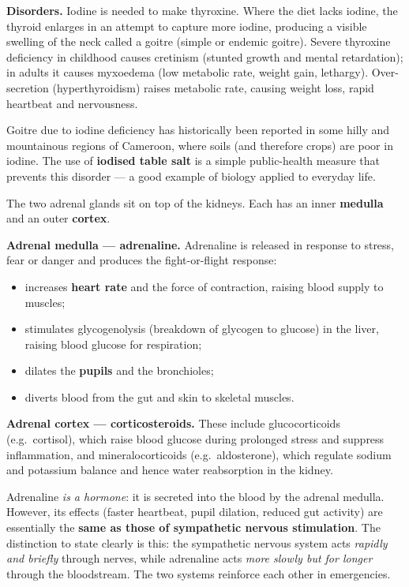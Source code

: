\documentclass[11pt]{article}
\newcommand{\cle}[1]{{\popxbold\color{popdark}#1}}
\newcounter{popsec}
\newcounter{popsub}
\newcommand{\courssub}[1]{%
  \stepcounter{popsub}%
  \par\vspace{9pt}\noindent{\popxbold\fontsize{11.5}{13}\selectfont\color{popink}{\color{poporange}\thepopsec.\thepopsub}\hspace{6pt}#1}\par\nopagebreak\vspace{4pt}
}
\begin{document}
\textbf{Disorders.} Iodine is needed to make thyroxine. Where the diet lacks iodine, the thyroid enlarges in an attempt to capture more iodine, producing a visible swelling of the neck called a \cle{goitre} (simple or endemic goitre). Severe thyroxine deficiency in childhood causes \cle{cretinism} (stunted growth and mental retardation); in adults it causes \cle{myxoedema} (low metabolic rate, weight gain, lethargy). Over-secretion (hyperthyroidism) raises metabolic rate, causing weight loss, rapid heartbeat and nervousness.

\begin{savaistu}
Goitre due to iodine deficiency has historically been reported in some hilly and mountainous regions of Cameroon, where soils (and therefore crops) are poor in iodine. The use of \textbf{iodised table salt} is a simple public-health measure that prevents this disorder --- a good example of biology applied to everyday life.
\end{savaistu}

\courssub{The Adrenal Glands}

The two \cle{adrenal glands} sit on top of the kidneys. Each has an inner \textbf{medulla} and an outer \textbf{cortex}.

\textbf{Adrenal medulla --- adrenaline.} \cle{Adrenaline} is released in response to stress, fear or danger and produces the \cle{fight-or-flight} response:

\begin{itemize}
\item increases \textbf{heart rate} and the force of contraction, raising blood supply to muscles;
\item stimulates \cle{glycogenolysis} (breakdown of glycogen to glucose) in the liver, raising blood glucose for respiration;
\item dilates the \textbf{pupils} and the bronchioles;
\item diverts blood from the gut and skin to skeletal muscles.
\end{itemize}

\textbf{Adrenal cortex --- corticosteroids.} These include glucocorticoids (e.g.\ cortisol), which raise blood glucose during prolonged stress and suppress inflammation, and mineralocorticoids (e.g.\ aldosterone), which regulate sodium and potassium balance and hence water reabsorption in the kidney.

\begin{attention}
Adrenaline \emph{is a hormone}: it is secreted into the blood by the adrenal medulla. However, its effects (faster heartbeat, pupil dilation, reduced gut activity) are essentially the \textbf{same as those of sympathetic nervous stimulation}. The distinction to state clearly is this: the sympathetic nervous system acts \emph{rapidly and briefly} through nerves, while adrenaline acts \emph{more slowly but for longer} through the bloodstream. The two systems reinforce each other in emergencies.
\end{attention}
\end{document}

